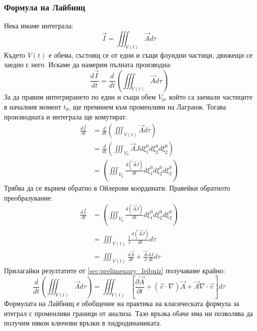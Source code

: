 \subsubsection{Формула на Лайбниц}
Нека имаме интеграла:
\begin{equation*}
	\vec{I} = \iiint_{V(t)} \vec{A} d \tau
\end{equation*}
Където $V(t)$ е обема, състоящ се от едни и същи флуидни частици, движещи се заедно с него. Искаме да намерим пълната производна:
\begin{equation*}
	\frac{d \vec{I}}{d t} = \frac{d}{d t}\left(\iiint_{V(t)} \vec{A} d \tau\right)
\end{equation*}
За да правим интегрирането по един и същи обем $V_0$, който са заемали частиците в началния момент $t_0$, ще преминем към променливи на Лагранж.
Тогава производната и интеграла ще комутират.
\begin{align*}
	\frac{d \vec{I}}{d t} & = \frac{d}{d t}\left(\iiint_{V(t)} \vec{A} d \tau\right)                             \\
	                      & = \frac{d}{d t}\left(\iiint_{V_0} \vec{A} J d \xi^0_1 d \xi^0_2 d \xi^0_2 \right)    \\
	                      & = \left(\iiint_{V_0} \frac{d(\vec{A} J) }{d t} d \xi^0_1 d \xi^0_2 d \xi^0_2 \right)
\end{align*}
Трябва да се върнем обратно в Ойлерови координати. Правейки обратното преобразувание:
\begin{align*}
	\frac{d \vec{I}}{d t} & = \left(\iiint_{V_0} \frac{d(\vec{A} J) }{d t} d \xi^0_1 d \xi^0_2 d \xi^0_2 \right) \\
	                      & = \iiint_{V(t)} \frac{1}{J}\frac{d(\vec{A} J) }{d t} d \tau                          \\
	                      & = \iiint_{V(t)} \frac{d \vec{A}}{d t} + \frac{\vec{A}}{J} \frac{d J}{d t} d \tau
\end{align*}
Прилагайки резултатите от \autoref{sec:prelimenary_leibniz} получаваме крайно:
\begin{equation}
	\label{eq:leibniz}
	\frac{d}{d t}\left(\iiint_{V(t)} \vec{A} d \tau\right) = \iiint_{V(t)} \left[
		\frac{\partial \vec{A}}{\partial t} + (\vec{v} \cdot \nabla) \vec{A} + \vec{A} \nabla \cdot \vec{v}
		\right] d\tau
\end{equation}
Формулата на Лайбниц е обобщение на практика на класическата формула за итеграл с променливи граници от анализа. Тазо връзка обаче има ни позволява да получим някои ключови връзки в хидродинамиката.
